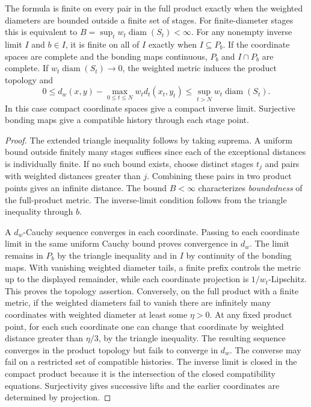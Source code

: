 \begin{proposition}\label{prop:weighted-history}
The formula is finite on every pair in the full product exactly when the weighted diameters are bounded outside a finite set of stages. For finite-diameter stages this is equivalent to $B=\sup_t w_t\operatorname{diam}(S_t)<\infty$. For any nonempty inverse limit $I$ and $b\in I$, it is finite on all of $I$ exactly when $I\subseteq P_b$. If the coordinate spaces are complete and the bonding maps continuous, $P_b$ and $I\cap P_b$ are complete. If $w_t\operatorname{diam}(S_t)\to0$, the weighted metric induces the product topology and
\[
 0\leq d_w(x,y)-\max_{0\leq t\leq N} w_t d_t(x_t,y_t)
 \leq \sup_{t>N} w_t\operatorname{diam}(S_t).
\]
In this case compact coordinate spaces give a compact inverse limit. Surjective bonding maps give a compatible history through each stage point.
\end{proposition}

\begin{proof}
The extended triangle inequality follows by taking suprema. A uniform bound outside finitely many stages suffices since each of the exceptional distances is individually finite. If no such bound exists, choose distinct stages $t_j$ and pairs with weighted distances greater than $j$. Combining these pairs in two product points gives an infinite distance. The bound $B<\infty$ characterizes \emph{boundedness} of the full-product metric. The inverse-limit condition follows from the triangle inequality through $b$.

A $d_w$-Cauchy sequence converges in each coordinate. Passing to each coordinate limit in the same uniform Cauchy bound proves convergence in $d_w$. The limit remains in $P_b$ by the triangle inequality and in $I$ by continuity of the bonding maps. With vanishing weighted diameter tails, a finite prefix controls the metric up to the displayed remainder, while each coordinate projection is $1/w_t$-Lipschitz. This proves the topology assertion. Conversely, on the full product with a finite metric, if the weighted diameters fail to vanish there are infinitely many coordinates with weighted diameter at least some $\eta>0$. At any fixed product point, for each such coordinate one can change that coordinate by weighted distance greater than $\eta/3$, by the triangle inequality. The resulting sequence converges in the product topology but fails to converge in $d_w$. The converse may fail on a restricted set of compatible histories. The inverse limit is closed in the compact product because it is the intersection of the closed compatibility equations. Surjectivity gives successive lifts and the earlier coordinates are determined by projection.
\end{proof}

